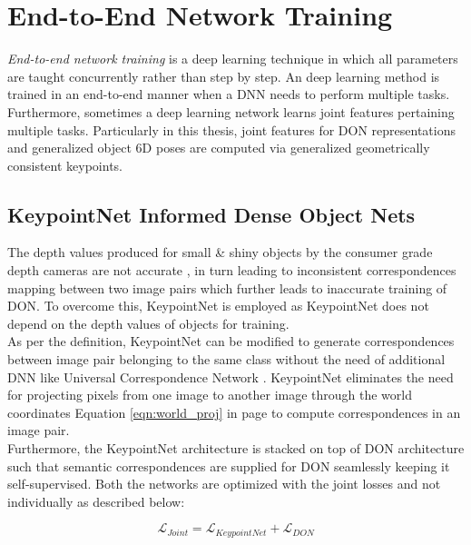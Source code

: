 \section{End-to-End Network Training}

\emph{End-to-end network training} is a deep learning technique in which all parameters are taught concurrently rather than step by step.
An deep learning method is trained in an end-to-end manner when a \ac{DNN} needs to perform multiple tasks. Furthermore, sometimes a deep learning network learns
joint features pertaining multiple tasks. Particularly in this thesis, joint features for \ac{DON} representations and generalized object 6D poses are
computed via generalized geometrically consistent keypoints.\\




\subsection{KeypointNet Informed Dense Object Nets}

The depth values produced for small \& shiny objects by the consumer grade depth cameras are not accurate \cite{kupcsik2021supervised}, in turn
leading to inconsistent correspondences mapping between two image pairs which further leads to inaccurate training of \ac{DON}. To overcome this, KeypointNet is employed as KeypointNet
does not depend on the depth values of objects for training. \\

As per the definition, KeypointNet can be modified to generate correspondences between image pair
belonging to the same class without the need of additional \ac{DNN} like Universal Correspondence Network \cite{ucn}. KeypointNet eliminates the need for projecting
pixels from one image to another image through the world coordinates Equation \ref{eqn:world_proj} in page \pageref{eqn:world_proj} to compute correspondences in an image pair.\\

Furthermore, the KeypointNet architecture is stacked on top of \ac{DON} architecture such that semantic correspondences are supplied for \ac{DON} seamlessly keeping it self-supervised.
Both the networks are optimized with the joint losses and not individually as described below:


\begin{equation}
    \label{eqn:joint_loss}
    \mathcal{L}_{Joint} = \mathcal{L}_{KeypointNet} + \mathcal{L}_{DON}
\end{equation}

